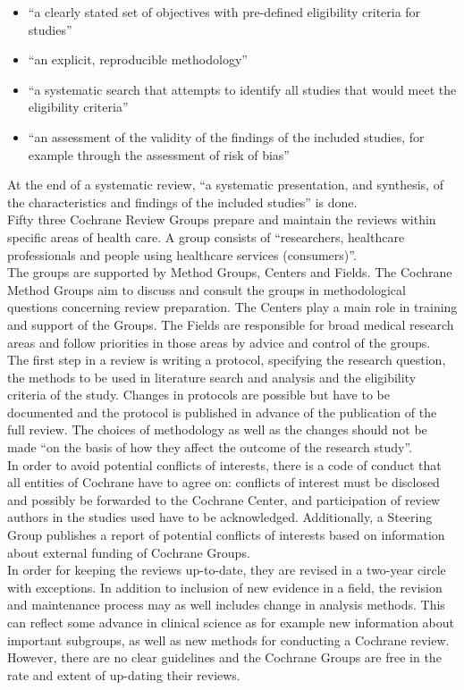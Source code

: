 \documentclass[11pt,a4paper,twoside]{book}\usepackage[]{graphicx}\usepackage[]{color}
\begin{document}
\begin{itemize}
\item``a clearly stated set of objectives with pre-defined eligibility criteria for studies''
\item ``an explicit, reproducible methodology''
\item ``a systematic search that attempts to identify all studies that would meet the eligibility criteria''
\item ``an assessment of the validity of the findings of the included studies, for example through the assessment of risk of bias''
\end{itemize}

At the end of a systematic review, ``a systematic presentation, and synthesis, of the characteristics and findings of the included studies'' is done. \\
Fifty three Cochrane Review Groups prepare and maintain the reviews within specific areas of health care. A group consists of ``researchers, healthcare professionals and people using healthcare services (consumers)''. \\
The groups are supported by Method Groups, Centers and Fields. The Cochrane Method Groups aim to discuss and consult the groups in methodological questions concerning review preparation. The Centers play a main role in training and support of the Groups. The Fields are responsible for broad medical research areas and follow priorities in those areas by advice and control of the groups. \\
The first step in a review is writing a protocol, specifying the research question, the methods to be used in literature search and analysis and the eligibility criteria of the study. Changes in protocols are possible but have to be documented and the protocol is published in advance of the publication of the full review. The choices of methodology as well as the changes should not be made ``on the basis of how they affect the outcome of the research study''. \\
In order to avoid potential conflicts of interests, there is a code of conduct that all entities of Cochrane have to agree on: conflicts of interest must be disclosed and possibly be forwarded to the Cochrane Center, and participation of review authors in the studies used have to be acknowledged. Additionally, a Steering Group publishes a report of potential conflicts of interests based on information about external funding of Cochrane Groups. \\
In order for keeping the reviews up-to-date, they are revised in a two-year circle with exceptions. In addition to inclusion of new evidence in a field, the revision and maintenance process may as well includes change in analysis methods. This can reflect some advance in clinical science as for example new information about important subgroups, as well as new methods for conducting a Cochrane review. However, there are no clear guidelines and the Cochrane Groups are free in the rate and extent of up-dating their reviews.
\end{document}
